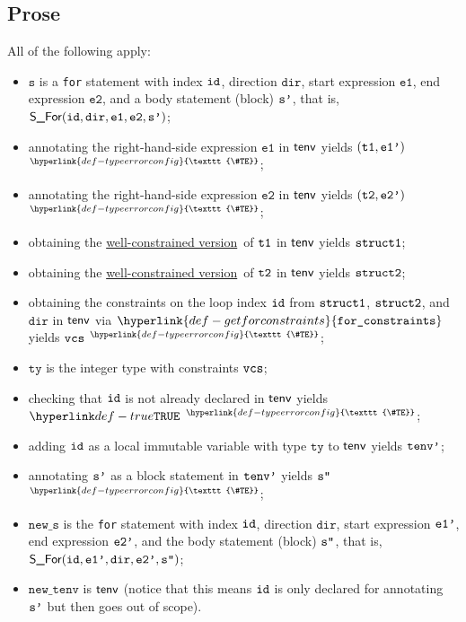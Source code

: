 \documentclass{book}
\newcommand\TypeErrorConfig[0]{\hyperlink{def-typeerrorconfig}{\texttt{\#TE}}}
\newcommand\ProseOrTypeError[0]{\hyperlink{def-proseortypeerror}{$^{\TypeErrorConfig}$}}
\newcommand\getforconstraints[0]{\hyperlink{def-getforconstraints}{\texttt{for\_constraints}}}
\newcommand\wellconstrainedversion[0]{\hyperlink{def-towellconstrained}{well-constrained version}}
\newcommand\newtenv[0]{\texttt{new\_tenv}}
\newcommand\veone[0]{\texttt{e1}}
\newcommand\vetwo[0]{\texttt{e2}}
\newcommand\vs[0]{\texttt{s}}
\newcommand\tty[0]{\texttt{ty}}
\newcommand\news[0]{\texttt{new\_s}}
\newcommand\dir[0]{\texttt{dir}}
\begin{document}
\subsection{Prose}
All of the following apply:
\begin{itemize}
  \item $\vs$ is a \texttt{for} statement with index $\texttt{id}$, direction $\dir$, start expression
        $\veone$, end expression $\vetwo$, and a body statement (block) $\texttt{s'}$, that is, $\SFor(\id, \dir, \veone, \vetwo, \vsp)$;
  \item annotating the right-hand-side expression $\veone$ in $\textsf{tenv}$ yields $(\texttt{t1}, \texttt{e1'})$ \ProseOrTypeError;
  \item annotating the right-hand-side expression $\vetwo$ in $\textsf{tenv}$ yields $(\texttt{t2}, \texttt{e2'})$ \ProseOrTypeError;
  \item obtaining the \wellconstrainedversion\ of $\texttt{t1}$ in $\textsf{tenv}$ yields $\texttt{struct1}$;
  \item obtaining the \wellconstrainedversion\ of $\texttt{t2}$ in $\textsf{tenv}$ yields $\texttt{struct2}$;
  \item obtaining the constraints on the loop index $\texttt{id}$ from $\texttt{struct1}$, $\texttt{struct2}$, and $\dir$ in $\textsf{tenv}$
        via $\getforconstraints$ yields $\texttt{vcs}$ \ProseOrTypeError;
  \item $\tty$ is the integer type with constraints $\texttt{vcs}$;
  \item checking that $\texttt{id}$ is not already declared in $\textsf{tenv}$ yields $\True$ \ProseOrTypeError;
  \item adding $\texttt{id}$ as a local immutable variable with type $\tty$ to $\textsf{tenv}$ yields $\texttt{tenv'}$;
  \item annotating $\texttt{s'}$ as a block statement in $\texttt{tenv'}$ yields $\texttt{s''}$ \ProseOrTypeError;
  \item $\news$ is the \texttt{for} statement with index $\texttt{id}$, direction $\dir$, start expression $\texttt{e1'}$,
        end expression $\texttt{e2'}$, and the body statement (block) $\texttt{s''}$, that is, \\
        $\SFor(\id, \veonep, \dir, \vetwop, \vspp)$;
  \item $\newtenv$ is $\textsf{tenv}$ (notice that this means $\texttt{id}$ is only declared for annotating $\texttt{s'}$ but then goes
        out of scope).
\end{itemize}
\end{document}
